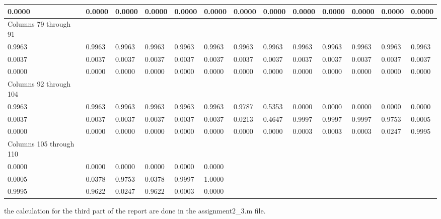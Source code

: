 \begin{table}[!h]
{\begin{tabular}{|l|l|l|l|l|l|l|l|l|l|l|l|l|}
		0.0000                   & 0.0000 & 0.0000 & 0.0000 & 0.0000 & 0.0000 & 0.0000 & 0.0000 & 0.0000 & 0.0000 & 0.0000 & 0.0000 & 0.0000 \\\hline
		Columns 79 through 91    &        &        &        &        &        &        &        &        &        &        &        &        \\\hline
		0.9963                   & 0.9963 & 0.9963 & 0.9963 & 0.9963 & 0.9963 & 0.9963 & 0.9963 & 0.9963 & 0.9963 & 0.9963 & 0.9963 & 0.9963 \\\hline
		0.0037                   & 0.0037 & 0.0037 & 0.0037 & 0.0037 & 0.0037 & 0.0037 & 0.0037 & 0.0037 & 0.0037 & 0.0037 & 0.0037 & 0.0037 \\\hline
		0.0000                   & 0.0000 & 0.0000 & 0.0000 & 0.0000 & 0.0000 & 0.0000 & 0.0000 & 0.0000 & 0.0000 & 0.0000 & 0.0000 & 0.0000 \\\hline
		Columns 92 through 104   &        &        &        &        &        &        &        &        &        &        &        &        \\\hline
		0.9963                   & 0.9963 & 0.9963 & 0.9963 & 0.9963 & 0.9963 & 0.9787 & 0.5353 & 0.0000 & 0.0000 & 0.0000 & 0.0000 & 0.0000 \\\hline
		0.0037                   & 0.0037 & 0.0037 & 0.0037 & 0.0037 & 0.0037 & 0.0213 & 0.4647 & 0.9997 & 0.9997 & 0.9997 & 0.9753 & 0.0005 \\\hline
		0.0000                   & 0.0000 & 0.0000 & 0.0000 & 0.0000 & 0.0000 & 0.0000 & 0.0000 & 0.0003 & 0.0003 & 0.0003 & 0.0247 & 0.9995 \\\hline
		Columns 105 through 110  &        &        &        &        &        &        &        &        &        &        &        &        \\\hline
		0.0000                   & 0.0000 & 0.0000 & 0.0000 & 0.0000 & 0.0000 &        &        &        &        &        &        &        \\\hline
		0.0005                   & 0.0378 & 0.9753 & 0.0378 & 0.9997 & 1.0000 &        &        &        &        &        &        &        \\\hline
		0.9995                   & 0.9622 & 0.0247 & 0.9622 & 0.0003 & 0.0000 &        &        &        &        &        &        &   \\ \hline   
	\end{tabular}
	}

\end{table}

the calculation for the third part of the report are done in the assignment2\_3.m file.

